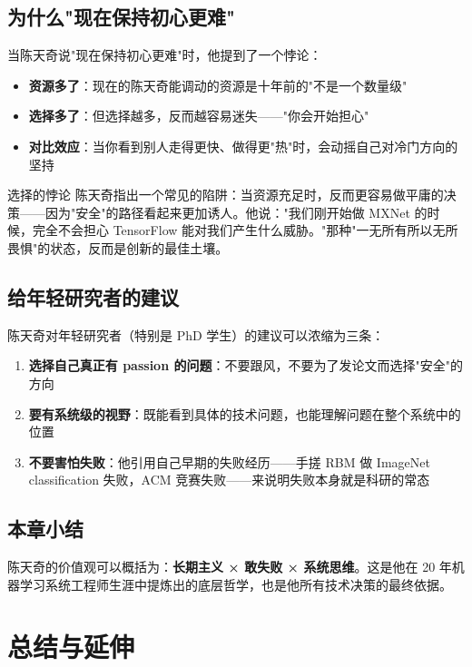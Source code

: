 \documentclass[a4paper]{article}
\begin{document}
\subsection{为什么"现在保持初心更难"}

当陈天奇说"现在保持初心更难"时，他提到了一个悖论：

\begin{itemize}
\item \textbf{资源多了}：现在的陈天奇能调动的资源是十年前的"不是一个数量级"
\item \textbf{选择多了}：但选择越多，反而越容易迷失——"你会开始担心"
\item \textbf{对比效应}：当你看到别人走得更快、做得更"热"时，会动摇自己对冷门方向的坚持
\end{itemize}

\begin{warningbox}{选择的悖论}
陈天奇指出一个常见的陷阱：当资源充足时，反而更容易做平庸的决策——因为"安全"的路径看起来更加诱人。他说："我们刚开始做 MXNet 的时候，完全不会担心 TensorFlow 能对我们产生什么威胁。"那种"一无所有所以无所畏惧"的状态，反而是创新的最佳土壤。
\end{warningbox}

\subsection{给年轻研究者的建议}

陈天奇对年轻研究者（特别是 PhD 学生）的建议可以浓缩为三条：

\begin{enumerate}
\item \textbf{选择自己真正有 passion 的问题}：不要跟风，不要为了发论文而选择"安全"的方向
\item \textbf{要有系统级的视野}：既能看到具体的技术问题，也能理解问题在整个系统中的位置
\item \textbf{不要害怕失败}：他引用自己早期的失败经历——手搓 RBM 做 ImageNet classification 失败，ACM 竞赛失败——来说明失败本身就是科研的常态
\end{enumerate}

\subsection{本章小结}

陈天奇的价值观可以概括为：\textbf{长期主义 × 敢失败 × 系统思维}。这是他在 20 年机器学习系统工程师生涯中提炼出的底层哲学，也是他所有技术决策的最终依据。

\section{总结与延伸}
\end{document}
